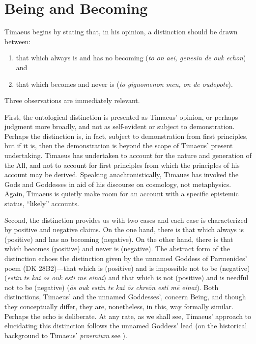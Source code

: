 
\section{Being and Becoming} %
\label{sec:Being and Becoming}

Timaeus begins by stating that, in his opinion, a distinction should be drawn between: 
\begin{enumerate}[(1)]
	\item that which always is and has no becoming (\emph{to on aei, genesin de ouk echon}) and
	\item that which becomes and never is (\emph{to gignomenon men, on de oudepote}).
\end{enumerate}
Three observations are immediately relevant. 

First, the ontological distinction is presented as Timaeus' opinion, or perhaps judgment more broadly, and not as self-evident or subject to demonstration. Perhaps the distinction is, in fact, subject to demonstration from first principles, but if it is, then the demonstration is beyond the scope of Timaeus' present undertaking. Timaeus has undertaken to account for the nature and generation of the All, and not to account for first principles from which the principles of his account may be derived. Speaking anachronistically, Timaues has invoked the Gods and Goddesses in aid of his discourse on cosmology, not metaphysics. Again, Timaeus is quietly make room for an account with a specific epistemic status, ``likely'' accounts.

Second, the distinction provides us with two cases and each case is characterized by positive and negative claims. On the one hand, there is that which always is (positive) and has no becoming (negative). On the other hand, there is that which becomes (positive) and never is (negative). The abstract form of the distinction echoes the distinction given by the unnamed Goddess of Parmenides' poem (DK 28B2)---that which is (positive) and is impossible not to be (negative) (\emph{estin te kai ōs ouk esti mē einai}) and that which is not (positive) and is needful not to be (negative) (\emph{ōs ouk estin te kai ōs chreōn esti mē einai}). Both distinctions, Timaeus' and the unnamed Goddesses', concern Being, and though they conceptually differ, they are, nonetheless, in this, way formally similar. Perhaps the echo is deliberate. At any rate, as we shall see, Timaeus' approach to elucidating this distinction follows the unnamed Goddess' lead (on the historical background to Timaeus' \emph{proemium} see \citealt{Runia:1997vz}).

